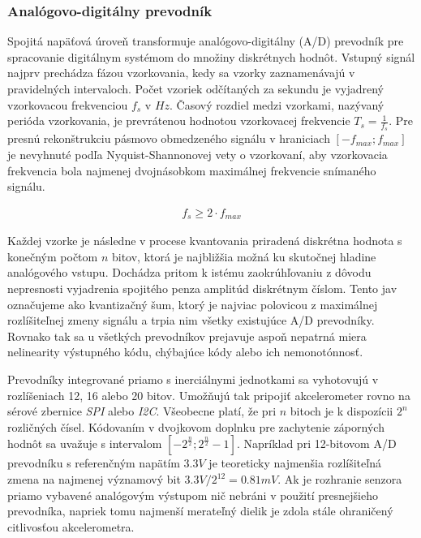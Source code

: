 \subsubsection{Analógovo-digitálny prevodník}
Spojitá napäťová úroveň transformuje analógovo-digitálny (A/D) prevodník pre spracovanie digitálnym systémom do množiny diskrétnych hodnôt. Vstupný signál najprv prechádza fázou vzorkovania, kedy sa vzorky zaznamenávajú v pravidelných intervaloch. Počet vzoriek odčítaných za sekundu je vyjadrený vzorkovacou frekvenciou $f_s$ v $Hz$. Časový rozdiel medzi vzorkami, nazývaný perióda vzorkovania, je prevrátenou hodnotou vzorkovacej frekvencie $T_s = \frac{1}{f_s}$. Pre presnú rekonštrukciu pásmovo obmedzeného signálu v hraniciach $[-f_{max}; f_{max}]$ je nevyhnuté podľa Nyquist-Shannonovej vety o vzorkovaní, aby vzorkovacia frekvencia bola najmenej dvojnásobkom maximálnej frekvencie snímaného signálu.
\begin{ceqn}\begin{align}
   f_s \geq 2 \cdot f_{max} 
\end{align}\end{ceqn} 

Každej vzorke je následne v procese kvantovania priradená diskrétna hodnota s konečným počtom $n$ bitov, ktorá je najbližšia možná ku skutočnej hladine analógového vstupu. Dochádza pritom k istému zaokrúhľovaniu z dôvodu nepresnosti vyjadrenia spojitého penza amplitúd diskrétnym číslom. Tento jav označujeme ako kvantizačný šum, ktorý je najviac polovicou z maximálnej rozlíšiteľnej zmeny signálu a trpia nim všetky existujúce A/D prevodníky. Rovnako tak sa u všetkých prevodníkov prejavuje aspoň nepatrná miera nelinearity výstupného kódu, chýbajúce kódy alebo ich nemonotónnosť.

Prevodníky integrované priamo s inerciálnymi jednotkami sa vyhotovujú v rozlíšeniach 12, 16 alebo 20 bitov. Umožňujú tak pripojiť akcelerometer rovno na sérové zbernice \emph{SPI} alebo \emph{I2C}. Všeobecne platí, že pri $n$ bitoch je k dispozícii $2^n$ rozličných čísel. Kódovaním v dvojkovom doplnku pre zachytenie záporných hodnôt sa uvažuje s intervalom $[-2^\frac{n}{2}; 2^\frac{n}{2} - 1]$. Napríklad pri 12-bitovom A/D prevodníku s referenčným napätím $3.3V$ je teoreticky najmenšia rozlíšiteľná zmena na najmenej významový bit $3.3V / 2^{12} = 0.81 mV$. Ak je rozhranie senzora priamo vybavené analógovým výstupom nič nebráni v použití presnejšieho prevodníka, napriek tomu najmenší merateľný dielik je zdola stále ohraničený citlivosťou akcelerometra. 

